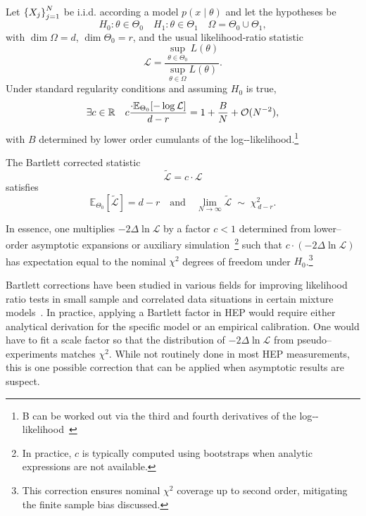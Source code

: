 \begin{theorem}
    Let \(\qty{X_j}_{j=1}^N\) be i.i.d. according a model \(p(x\mid\theta)\) and let the hypotheses be
    \[
        H_{0}:\theta\in\Theta_{0} \quad H_{1}:\theta\in\Theta_{1}\quad \Omega = \Theta_0\cup\Theta_1,
    \]
    with \(\dim\Omega=d\), \(\dim\Theta_{0}=r\), and the usual likelihood‐ratio statistic
    \[
        \mathcal L = \frac{\sup_{\theta\in\Theta_{0}}L(\theta)}{\sup_{\theta\in\Omega}L(\theta)}.
    \]
    Under standard regularity conditions and assuming \(H_{0}\) is true,
    \[
        \exists c\in\mathbb{R}\quad c\frac{\cdot\mathbb{E}_{\Theta_{0}}[-\log\mathcal L]}{d-r} = 1 + \frac{B}{N} + \mathcal{O}(N^{-2}),
    \]
    with \(B\) determined by lower order cumulants of the log‐-likelihood.\footnote{B can be worked out via the third and fourth derivatives of the log‐-likelihood~\cite{lawley_tests_1956}}
\end{theorem}
\begin{corollary}
    The Bartlett corrected statistic
    \[
        \widetilde{\mathcal L} = c\cdot \mathcal L
    \]
    satisfies
    \[
        \mathbb{E}_{\Theta_{0}}[\widetilde{\mathcal L}] = d-r
        \quad\text{and}\quad
        \lim_{N\to\infty}\widetilde{\mathcal L}\;\sim\;\chi^{2}_{\,d-r}.
    \]
\end{corollary}

            In essence, one multiplies $-2\Delta\ln\mathcal{L}$ by a factor $c < 1$ determined from lower--order asymptotic expansions or auxiliary simulation~\cite{Chen2020AVariables, battey_non-standard_2024}\footnote{In practice, \(c\) is typically computed using bootstraps when analytic expressions are not available.} such that $c \cdot (-2\Delta\ln\mathcal{L})$ has expectation equal to the nominal $\chi^2$ degrees of freedom under $H_0$.\footnote{This correction ensures nominal \(\chi^2\) coverage up to second order, mitigating the finite sample bias discussed.}
            
            Bartlett corrections have been studied in various fields for improving likelihood ratio tests in small sample and correlated data situations in certain mixture models~\cite{hu_mixture_2022}.
            In practice, applying a Bartlett factor in HEP would require either analytical derivation for the specific model or an empirical calibration.
            One would have to fit a scale factor so that the distribution of $-2\Delta\ln\mathcal{L}$ from pseudo--experiments matches $\chi^2$.
            While not routinely done in most HEP measurements, this is one possible  correction that can be applied when asymptotic results are suspect.

